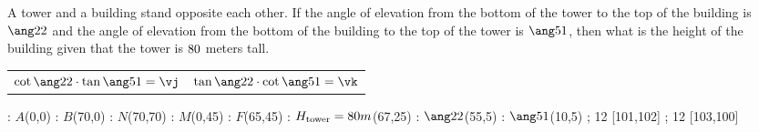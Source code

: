 

\DEGREESCOT\va\vc
\DEGREESCOT\vb\vd
\DEGREESTAN\va\vx
\DEGREESTAN\vb\vy

\MULTIPLY\vc\vy\vm %
\MULTIPLY\vd\vx\vn%

\ROUND[2]\vm\vj
\ROUND[2]\vn\vk
\MULTIPLY\vh\vk\vl
\ROUND[2]\vl\vz

\question[2] A tower and a building stand opposite each other. If the angle of elevation
from the bottom of the tower to the top of the building is $\ang\va$ and the angle
of elevation from the bottom of the building to the top of the tower is $\ang\vb$, then
what is the height of the building given that the tower is $80$ meters tall.

\watchout

\begin{calcaid}
  \begin{tabular}{c c}
    $\cot\ang\va\cdot\tan\ang\vb=\vj$ & $\tan\ang\va\cdot\cot\ang\vb=\vk$
  \end{tabular}
\end{calcaid}

\ifprintanswers
  \begin{marginfigure}[-200pt]
      : $A$(0,0)
      : $B$(70,0)
      : $N$(70,70)
      : $M$(0,45)
      : $F$(65,45)
      : $H_{\text{tower}} = 80 m$(67,25)
      : $\ang\va$(55,5)
      : $\ang\vb$(10,5)
    \figdrawbegin{}
      \figdrawline [100,101,102,100]
      \figdrawline [101,103,100]
       ; 12 [101,102] 
       ; 12 [103,100] 
    \figdrawend
    \centerline{\box\figBoxA}
  \end{marginfigure}
\fi 

